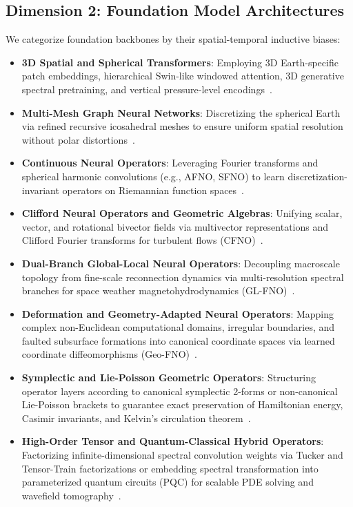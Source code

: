 \subsection{Dimension 2: Foundation Model Architectures}
We categorize foundation backbones by their spatial-temporal inductive biases:
\begin{itemize}
    \item \textbf{3D Spatial and Spherical Transformers}: Employing 3D Earth-specific patch embeddings, hierarchical Swin-like windowed attention, 3D generative spectral pretraining, and vertical pressure-level encodings~\cite{bi2023pangu,bodnar2024aurora,chen2023fuxi,nguyen2023stormer,hong2024spectralgpt}.
    \item \textbf{Multi-Mesh Graph Neural Networks}: Discretizing the spherical Earth via refined recursive icosahedral meshes to ensure uniform spatial resolution without polar distortions~\cite{lam2023graphcast}.
    \item \textbf{Continuous Neural Operators}: Leveraging Fourier transforms and spherical harmonic convolutions (e.g., AFNO, SFNO) to learn discretization-invariant operators on Riemannian function spaces~\cite{pathak2022fourcastnet,bonev2023sfno,mansouri2025solarwind}.
    \item \textbf{Clifford Neural Operators and Geometric Algebras}: Unifying scalar, vector, and rotational bivector fields via multivector representations and Clifford Fourier transforms for turbulent flows (CFNO)~\cite{brandstetter2023clifford}.
    \item \textbf{Dual-Branch Global-Local Neural Operators}: Decoupling macroscale topology from fine-scale reconnection dynamics via multi-resolution spectral branches for space weather magnetohydrodynamics (GL-FNO)~\cite{du2024glfno}.
    \item \textbf{Deformation and Geometry-Adapted Neural Operators}: Mapping complex non-Euclidean computational domains, irregular boundaries, and faulted subsurface formations into canonical coordinate spaces via learned coordinate diffeomorphisms (Geo-FNO)~\cite{li2022geofno}.
    \item \textbf{Symplectic and Lie-Poisson Geometric Operators}: Structuring operator layers according to canonical symplectic 2-forms or non-canonical Lie-Poisson brackets to guarantee exact preservation of Hamiltonian energy, Casimir invariants, and Kelvin's circulation theorem~\cite{makara2026symplectic,eldred2023lpnets}.
    \item \textbf{High-Order Tensor and Quantum-Classical Hybrid Operators}: Factorizing infinite-dimensional spectral convolution weights via Tucker and Tensor-Train factorizations or embedding spectral transformation into parameterized quantum circuits (PQC) for scalable PDE solving and wavefield tomography~\cite{kossaifi2024multigrid,yang2021seismic,marcandelli2025phqfno}.

\end{itemize}

